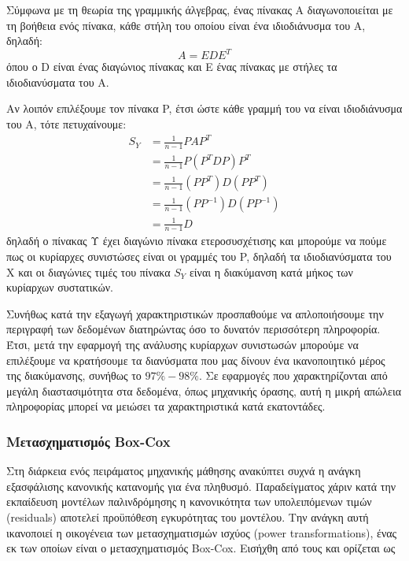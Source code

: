 Σύμφωνα με τη θεωρία της γραμμικής άλγεβρας, ένας πίνακας Α διαγωνοποιείται  με τη βοήθεια ενός πίνακα, κάθε στήλη του οποίου είναι ένα ιδιοδιάνυσμα του Α, δηλαδή:
\begin{equation} 
A=EDE^T
\end{equation} 
όπου ο D είναι ένας διαγώνιος πίνακας και Ε ένας πίνακας με στήλες τα ιδιοδιανύσματα του Α. 

Αν λοιπόν επιλέξουμε τον πίνακα P, έτσι ώστε κάθε γραμμή του να είναι ιδιοδιάνυσμα του A, τότε πετυχαίνουμε:
\begin{equation} 
\begin{split}
S_Y & = \frac{1}{n-1} PAP^T \\
& = \frac{1}{n-1} P(P^TDP)P^T \\
& = \frac{1}{n-1} (PP^T)D(PP^T)\\
& = \frac{1}{n-1}(PP^{-1})D(PP^{-1})\\
& = \frac{1}{n-1} D
\end{split}
\end{equation} 
δηλαδή ο πίνακας Υ έχει διαγώνιο πίνακα ετεροσυσχέτισης και μπορούμε να πούμε πως οι κυρίαρχες συνιστώσες είναι οι γραμμές του P, δηλαδή τα ιδιοδιανύσματα του X και οι διαγώνιες τιμές του πίνακα $S_Y$ είναι η διακύμανση κατά μήκος των κυρίαρχων συστατικών.

Συνήθως κατά την εξαγωγή χαρακτηριστικών προσπαθούμε να απλοποιήσουμε την περιγραφή των δεδομένων διατηρώντας όσο το δυνατόν περισσότερη πληροφορία. Έτσι, μετά την εφαρμογή της ανάλυσης κυρίαρχων συνιστωσών μπορούμε να επιλέξουμε να κρατήσουμε τα διανύσματα που μας δίνουν ένα ικανοποιητικό μέρος της διακύμανσης, συνήθως το $ 97\% -98\% $. Σε εφαρμογές που χαρακτηρίζονται από μεγάλη διαστασιμότητα στα δεδομένα, όπως μηχανικής όρασης, αυτή η μικρή απώλεια πληροφορίας μπορεί να μειώσει τα χαρακτηριστικά κατά εκατοντάδες.

\subsubsection{Μετασχηματισμός Box-Cox}
Στη διάρκεια ενός πειράματος μηχανικής μάθησης ανακύπτει συχνά η ανάγκη εξασφάλισης κανονικής κατανομής για ένα πληθυσμό. Παραδείγματος χάριν κατά την εκπαίδευση μοντέλων παλινδρόμησης η κανονικότητα των υπολειπόμενων τιμών (residuals) αποτελεί προϋπόθεση εγκυρότητας του μοντέλου. Την ανάγκη αυτή ικανοποιεί η οικογένεια των μετασχηματισμών ισχύος (power transformations), ένας εκ των οποίων είναι ο μετασχηματισμός Box-Cox. Εισήχθη από τους \citet{10.2307/2984418} και ορίζεται ως

